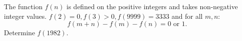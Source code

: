 The function $f(n)$ is defined on the positive integers and takes non-negative integer values. $f(2)=0,f(3)>0,f(9999)=3333$ and for all $m,n:$ \[ f(m+n)-f(m)-f(n)=0 \text{ or } 1. \] Determine $f(1982)$.